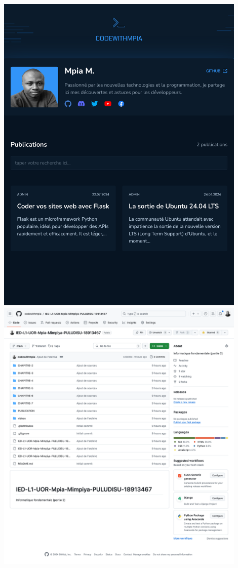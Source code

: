 \documentclass[a4paper,11pt]{article}
\begin{document}
            \includegraphics[width=0.9\textwidth]{TP-1/screen3.png}\\
            \includegraphics[width=0.9\textwidth]{TP-1/screen4.png}\\
\end{document}
